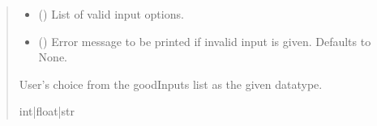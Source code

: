 \documentclass[letterpaper,10pt,english]{sphinxmanual}
\begin{document}
\begin{fulllineitems}
\begin{fulllineitems}
\begin{quote}
\begin{description}
\begin{itemize}
\item {} 
\sphinxAtStartPar
{} () \textendash{} List of valid input options.

\item {} 
\sphinxAtStartPar
{} (\sphinxstyleliteralemphasis{\sphinxupquote{ | }}\sphinxstyleliteralemphasis{\sphinxupquote{, }}) \textendash{} Error message to be printed if invalid input is given.                 Defaults to None.

\end{itemize}

\sphinxAtStartPar
User’s choice from the goodInputs list as the given datatype.

\sphinxAtStartPar
int|float|str

\end{description}\end{quote}

\end{fulllineitems}



\end{fulllineitems}
\end{document}
